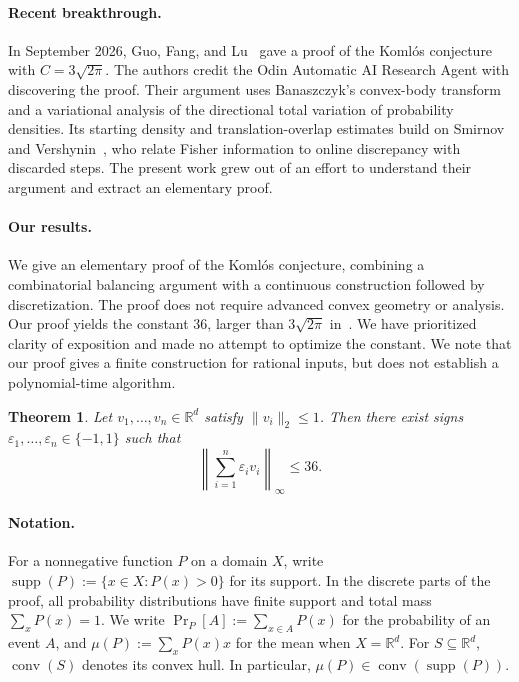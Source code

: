 \documentclass{article}
\newtheorem{theorem}{Theorem}[section]
\newcommand{\R}{\mathbb{R}}
\newcommand{\eps}{\varepsilon}
\newcommand{\supp}{\operatorname{supp}}
\newcommand{\norm}[1]{\left \| #1 \right \|}
\begin{document}
\paragraph{Recent breakthrough.}
In September 2026, Guo, Fang, and Lu~\cite{guo2026vector} gave a proof
of the Koml\'os conjecture with $C=3\sqrt{2\pi}$.
The authors credit the Odin Automatic AI Research Agent with
discovering the proof.
Their argument uses Banaszczyk's convex-body transform and
a variational analysis of the directional total variation
of probability densities.
Its starting density and translation-overlap estimates build on
Smirnov and Vershynin~\cite{smirnov2026fisher}, who relate Fisher
information to online discrepancy with discarded steps.
The present work grew out of an effort to understand their
argument and extract an elementary proof.

\paragraph{Our results.}
We give an elementary proof of the Koml\'os conjecture,
combining a combinatorial balancing argument with a continuous
construction followed by discretization. The proof does not
require advanced convex geometry or analysis.
Our proof yields the constant $36$, larger than
$3\sqrt{2\pi}$ in~\cite{guo2026vector}.
We have prioritized clarity of exposition and made no attempt
to optimize the constant.
We note that our proof gives a finite construction for rational inputs, but does not establish a polynomial-time algorithm.

\begin{theorem}
\label{thm:komlos}
Let $v_1,\ldots,v_n \in \R^d$ satisfy $\|v_i\|_2 \le 1$.
Then there exist signs $\eps_1,\ldots,\eps_n \in \{-1,1\}$ such that
\[
\norm{\sum_{i=1}^n \eps_i v_i}_{\infty} \le 36.
\]
\end{theorem}

\paragraph{Notation.}
For a nonnegative function $P$ on a domain $X$, write
$\supp(P):=\{x\in X:P(x)>0\}$ for its support.
In the discrete parts of the proof, all probability distributions
have finite support and total mass $\sum_xP(x)=1$.
We write $\Pr_P[A]:=\sum_{x\in A}P(x)$ for the probability of an
event $A$, and $\mu(P):=\sum_xP(x)x$ for the mean when $X=\R^d$.
For $S\subseteq\R^d$, $\operatorname{conv}(S)$ denotes its convex
hull. In particular, $\mu(P)\in\operatorname{conv}(\supp(P))$.
\end{document}
